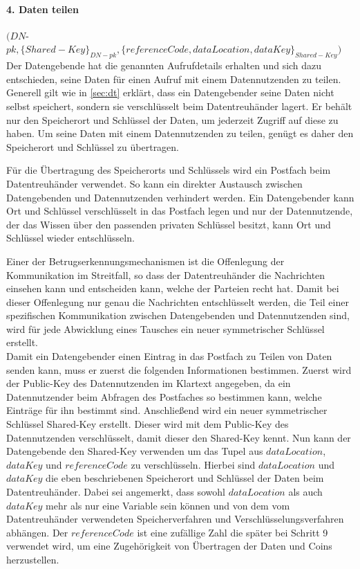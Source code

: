 \documentclass[
	fontsize=12pt,
	headings=small,
	parskip=half,           %
	bibliography=totoc,
	numbers=noenddot,       %
	open=any,               %
]{scrreprt}
\begin{document}
\paragraph{4. Daten teilen} $(DN$-$pk, \{Shared-Key\}_{DN-pk}, \{referenceCode, dataLocation, dataKey\}_{Shared-Key})$\\
Der Datengebende hat die genannten Aufrufdetails erhalten und sich dazu entschieden, seine Daten für einen Aufruf mit einem Datennutzenden zu teilen. Generell gilt wie in \ref{sec:dt} erklärt, dass ein Datengebender seine Daten nicht selbst speichert, sondern sie verschlüsselt beim Datentreuhänder lagert. Er behält nur den Speicherort und Schlüssel der Daten, um jederzeit Zugriff auf diese zu haben. Um seine Daten mit einem Datennutzenden zu teilen, genügt es daher den Speicherort und Schlüssel zu übertragen.

Für die Übertragung des Speicherorts und Schlüssels wird ein Postfach beim Datentreuhänder verwendet. So kann ein direkter Austausch zwischen Datengebenden und Datennutzenden verhindert werden. Ein Datengebender kann Ort und Schlüssel verschlüsselt in das Postfach legen und nur der Datennutzende, der das Wissen über den passenden privaten Schlüssel besitzt, kann Ort und Schlüssel wieder entschlüsseln.

Einer der Betrugserkennungsmechanismen ist die Offenlegung der Kommunikation im Streitfall, so dass der Datentreuhänder die Nachrichten einsehen kann und entscheiden kann, welche der Parteien recht hat. Damit bei dieser Offenlegung nur genau die Nachrichten entschlüsselt werden, die Teil einer spezifischen Kommunikation zwischen Datengebenden und Datennutzenden sind, wird für jede Abwicklung eines Tausches ein neuer symmetrischer Schlüssel erstellt.\\

Damit ein Datengebender einen Eintrag in das Postfach zu Teilen von Daten senden kann, muss er zuerst die folgenden Informationen bestimmen. Zuerst wird der Public-Key des Datennutzenden im Klartext angegeben, da ein Datennutzender beim Abfragen des Postfaches so bestimmen kann, welche Einträge für ihn bestimmt sind. Anschließend wird ein neuer symmetrischer Schlüssel Shared-Key erstellt. Dieser wird mit dem Public-Key des Datennutzenden verschlüsselt, damit dieser den Shared-Key kennt. Nun kann der Datengebende den Shared-Key verwenden um das Tupel aus $dataLocation$, $dataKey$ und $referenceCode$ zu verschlüsseln. Hierbei sind $dataLocation$ und $dataKey$ die eben beschriebenen Speicherort und Schlüssel der Daten beim Datentreuhänder. Dabei sei angemerkt, dass sowohl $dataLocation$ als auch $dataKey$ mehr als nur eine Variable sein können und von dem vom Datentreuhänder verwendeten Speicherverfahren und Verschlüsselungsverfahren abhängen. Der $referenceCode$ ist eine zufällige Zahl die später bei Schritt 9 verwendet wird, um eine Zugehörigkeit von Übertragen der Daten und Coins herzustellen.
\end{document}
